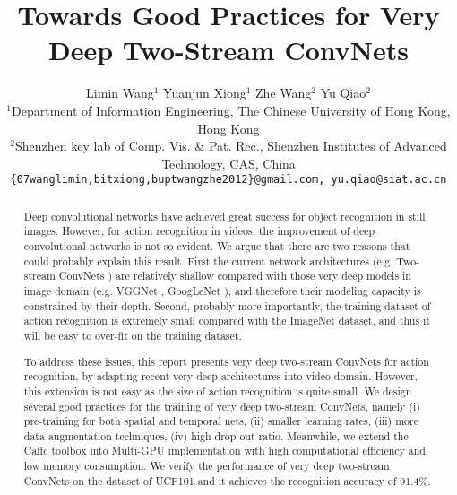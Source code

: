 \documentclass[10pt,twocolumn,letterpaper]{article}
\begin{document}
\title{Towards Good Practices for Very Deep Two-Stream ConvNets}

\author{Limin Wang$^1$ \quad \quad Yuanjun Xiong$^1$ \quad \quad Zhe Wang$^2$ \quad \quad Yu Qiao$^2$ \\
\small $^1$Department of Information Engineering, The Chinese University of Hong Kong, Hong Kong \\
\small $^2$Shenzhen key lab of Comp. Vis. \& Pat. Rec.,  Shenzhen Institutes of Advanced Technology, CAS, China \\
{\tt\small \{07wanglimin,bitxiong,buptwangzhe2012\}@gmail.com, yu.qiao@siat.ac.cn}
}

\maketitle

\begin{abstract}
  Deep convolutional networks have achieved great success for object recognition in still images. However, for action recognition in videos, the improvement of deep convolutional networks is not so evident. We argue that there are two reasons that could probably explain this result. First the current network architectures (e.g. Two-stream ConvNets \cite{SimonyanZ14}) are relatively shallow compared with those very deep models in image domain (e.g. VGGNet \cite{SimonyanZ14a}, GoogLeNet \cite{SzegedyLJSRAEVR14}), and therefore their modeling capacity is constrained by their depth. Second, probably more importantly, the training dataset of action recognition is extremely small compared with the ImageNet dataset, and thus it will be easy to over-fit on the training dataset.
  
  To address these issues, this report presents very deep two-stream ConvNets for action recognition, by adapting recent very deep architectures into video domain. However, this extension is not easy as the size of action recognition is quite small. We design several good practices for the training of very deep two-stream ConvNets, namely (i) pre-training for both spatial and temporal nets, (ii) smaller learning rates, (iii) more data augmentation techniques, (iv) high drop out ratio. Meanwhile, we extend the Caffe toolbox into Multi-GPU implementation with high computational efficiency and low memory consumption. We verify the performance of very deep two-stream ConvNets on the dataset of UCF101 and it achieves the recognition accuracy of $91.4\%$.
\end{abstract}
\end{document}
